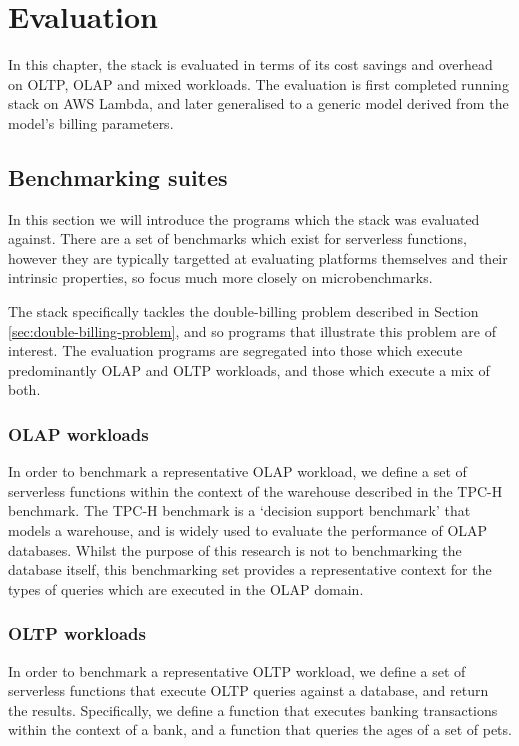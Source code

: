 \chapter{Evaluation}

In this chapter, the \faaas{} stack is evaluated in terms of its cost savings and overhead on OLTP, OLAP and mixed workloads. The evaluation is first completed running \faaas{} stack on AWS Lambda, and later generalised to a generic model derived from the model's billing parameters.

\section{Benchmarking suites}
In this section we will introduce the programs which the \faaas{} stack was evaluated against. There are a set of benchmarks which exist for serverless functions, however they are typically targetted at evaluating \faas{} platforms themselves and their intrinsic properties, so focus much more closely on microbenchmarks.

The \faaas{} stack specifically tackles the double-billing problem described in Section \ref{sec:double-billing-problem}, and so programs that illustrate this problem are of interest. The evaluation programs are segregated into those which execute predominantly OLAP and OLTP workloads, and those which execute a mix of both.

\subsection{OLAP workloads}
In order to benchmark a representative OLAP workload, we define a set of serverless functions within the context of the warehouse described in the TPC-H benchmark. The TPC-H benchmark is a `decision support benchmark' that models a warehouse, and is widely used to evaluate the performance of OLAP databases. Whilst the purpose of this research is not to benchmarking the database itself, this benchmarking set provides a representative context for the types of queries which are executed in the OLAP domain.

\subsection{OLTP workloads}
In order to benchmark a representative OLTP workload, we define a set of serverless functions that execute OLTP queries against a database, and return the results. Specifically, we define a function that executes banking transactions within the context of a bank, and a function that queries the ages of a set of pets.

